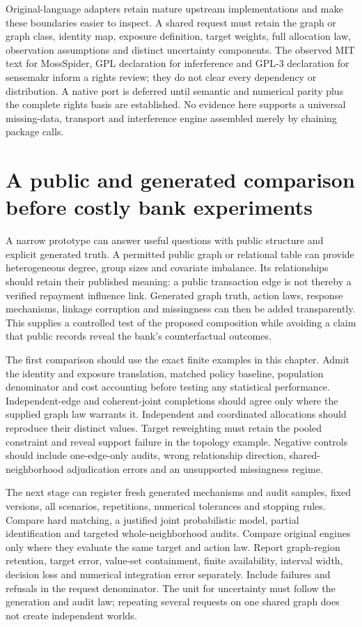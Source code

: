 Original-language adapters retain mature upstream implementations and make
these boundaries easier to inspect. A shared request must retain the graph
or graph class, identity map, exposure definition, target weights, full
allocation law, observation assumptions and distinct uncertainty components.
The observed MIT text for MossSpider, GPL declaration for inferference and
GPL-3 declaration for sensemakr inform a rights review; they do not clear
every dependency or distribution.\citep{exec17_s7_paths} A native port is
deferred until semantic and numerical parity plus the complete rights basis
are established. No evidence here supports a universal missing-data,
transport and interference engine assembled merely by chaining package calls.

\section{A public and generated comparison before costly bank experiments}
\label{exec17:s7-prototype}

A narrow prototype can answer useful questions with public structure and
explicit generated truth. A permitted public graph or relational table can
provide heterogeneous degree, group sizes and covariate imbalance. Its
relationships should retain their published meaning: a public transaction
edge is not thereby a verified repayment influence link. Generated graph
truth, action laws, response mechanisms, linkage corruption and missingness
can then be added transparently. This supplies a controlled test of the
proposed composition while avoiding a claim that public records reveal the
bank's counterfactual outcomes.\citep{exec17_s7_design}

The first comparison should use the exact finite examples in this chapter.
Admit the identity and exposure translation, matched policy baseline,
population denominator and cost accounting before testing any statistical
performance. Independent-edge and coherent-joint completions should agree
only where the supplied graph law warrants it. Independent and coordinated
allocations should reproduce their distinct values. Target reweighting must
retain the pooled constraint and reveal support failure in the topology
example. Negative controls should include one-edge-only audits, wrong
relationship direction, shared-neighborhood adjudication errors and an
unsupported missingness regime.

The next stage can register fresh generated mechanisms and audit samples,
fixed versions, all scenarios, repetitions, numerical tolerances and stopping
rules. Compare hard matching, a justified joint probabilistic model, partial
identification and targeted whole-neighborhood audits. Compare original
engines only where they evaluate the same target and action law. Report
graph-region retention, target error, value-set containment, finite
availability, interval width, decision loss and numerical integration error
separately. Include failures and refusals in the request denominator. The
unit for uncertainty must follow the generation and audit law; repeating
several requests on one shared graph does not create independent worlds.

